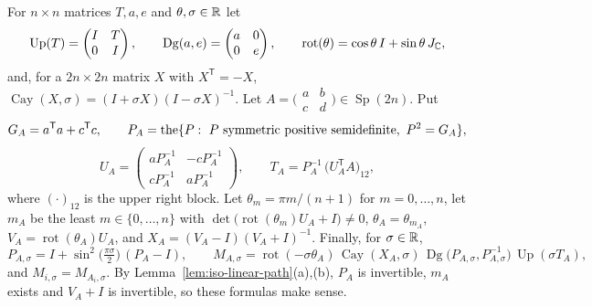 \begin{definition}\label{def:iso-linear-path}
For $n\times n$ matrices $T,a,e$ and $\theta,\sigma\in\mathbb{R}$ let
\[
 \operatorname{Up}(T)=\begin{pmatrix}I&T\\0&I\end{pmatrix},\qquad
 \operatorname{Dg}(a,e)=\begin{pmatrix}a&0\\0&e\end{pmatrix},\qquad
 \operatorname{rot}(\theta)=\cos\theta\,I+\sin\theta\,J_{\mathbb{C}} ,
\]
and, for a $2n\times2n$ matrix $X$ with $X^{\mathsf T}=-X$,
$\operatorname{Cay}(X,\sigma)=(I+\sigma X)(I-\sigma X)^{-1}$. Let $A=\bigl(\begin{smallmatrix}a&b\\c&d\end{smallmatrix}\bigr)
\in\operatorname{Sp}(2n)$. Put
\[
 G_A=a^{\mathsf T}a+c^{\mathsf T}c,\qquad P_A=\defdesc\{P:\ P\text{ symmetric positive semidefinite},\ P^2=G_A\},
\]
\[
 U_A=\begin{pmatrix}aP_A^{-1}&-cP_A^{-1}\\cP_A^{-1}&aP_A^{-1}\end{pmatrix},\qquad
 T_A=P_A^{-1}\,\big(U_A^{\mathsf T}A\big)_{12},
\]
where $(\cdot)_{12}$ is the upper right block. Let $\theta_m=\pi m/(n+1)$ for $m=0,\dots,n$, let $m_A$ be the least
$m\in\{0,\dots,n\}$ with $\det\big(\operatorname{rot}(\theta_m)U_A+I\big)\ne0$, $\theta_A=\theta_{m_A}$,
$V_A=\operatorname{rot}(\theta_A)U_A$, and $X_A=(V_A-I)(V_A+I)^{-1}$. Finally, for $\sigma\in\mathbb{R}$,
\[
 P_{A,\sigma}=I+\sin^2\!\big(\tfrac{\pi\sigma}2\big)\,(P_A-I),\qquad
 M_{A,\sigma}=\operatorname{rot}(-\sigma\theta_A)\,\operatorname{Cay}(X_A,\sigma)\,
 \operatorname{Dg}\big(P_{A,\sigma},P_{A,\sigma}^{-1}\big)\,\operatorname{Up}(\sigma T_A),
\]
and $M_{i,\sigma}=M_{A_i,\sigma}$. By Lemma~\ref{lem:iso-linear-path}(a),(b), $P_A$ is invertible, $m_A$ exists and $V_A+I$
is invertible, so these formulas make sense.
\end{definition}


